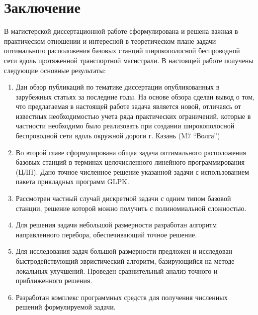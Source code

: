 \chapter*{Заключение}						%

В магистерской диссертационной работе сформулирована и решена важная в практическом отношении и интересной в теоретическом плане задачи оптимального расположения базовых станций широкополосной беспроводной сети вдоль протяженной транспортной магистрали. В настоящей работе получены следующие основные результаты:
\begin{enumerate}
	\item Дан обзор публикаций по тематике диссертации опубликованных в зарубежных статьях за последние годы.  На основе обзора сделан вывод о том, что предлагаемая в настоящей работе задача является новой, отличаясь от известных необходимостью учета ряда практических ограничений, которые в частности необходимо было реализовать при создании широкополосной беспроводной сети вдоль окружной дороги г. Казань (M7  ``Волга'')
	\item Во второй главе сформулирована общая задача оптимального расположения базовых станций в терминах целочисленного линейного программирования (ЦЛП). Дано точное численное решение указанной задачи с использованием пакета прикладных программ GLPK.
	\item Рассмотрен частный случай дискретной задачи с одним типом базовой станции, решение которой можно получить с полиномиальной сложностью.
	\item Для решения задачи небольшой размерности разработан алгоритм направленного перебора, обеспечивающий точное решение.
	\item Для исследования задач большой размерности предложен и исследован быстродействующий эвристический алгоритм, базирующийся на методе локальных улучшений. Проведен сравнительный анализ точного и приближенного решения. 
	\item Разработан комплекс программных средств для получения численных решений формулируемой задачи.
\end{enumerate}



\clearpage